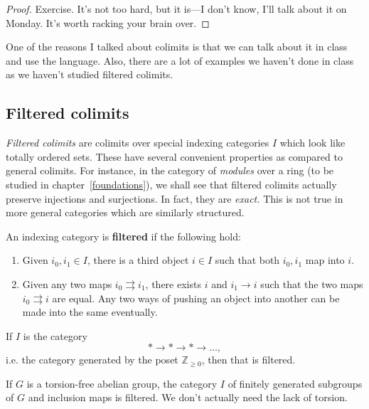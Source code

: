 \begin{proof} 
Exercise. It's not too hard, but it is---I don't know, I'll talk about it on
Monday. It's worth racking your brain over.
\end{proof} 

One of the reasons I talked about colimits is that we can talk about it in
class and use the language. Also, there are a lot of examples we haven't done
in class as we haven't studied filtered colimits.

\subsection{Filtered colimits}


\emph{Filtered colimits} are colimits
over special indexing categories $I$ which look like totally ordered sets.
These have several convenient properties as compared to general colimits.
For instance, in the category of \emph{modules} over a ring (to be studied in
chapter~\ref{foundations}), we shall see that filtered colimits actually
preserve injections and surjections. In fact, they are \emph{exact.} This is
not true in more general categories which are similarly structured.



\begin{definition} 
An indexing category is \textbf{filtered} if the following hold:
\begin{enumerate}
\item Given $i_0, i_1 \in I$, there is a third object $i \in I$ such that both
$i_0, i_1$ map into $i$. 
\item Given any two maps $i_0 \rightrightarrows i_1$, there exists $i$ and $i_1
\to i$ such that the two maps $i_0 \rightrightarrows i$ are equal. Any two ways
of pushing an object into another can be made into the same eventually. 
\end{enumerate}
\end{definition} 

\begin{example} 
If $I$ is the category
\[ \ast \to \ast \to \ast \to \dots,  \]
i.e. the category generated by the poset $\mathbb{Z}_{\geq 0}$, then that is
filtered.
\end{example} 


\begin{example} 
If $G$ is a torsion-free abelian group, the category $I$ of finitely generated
subgroups of $G$ and inclusion maps is filtered. We don't actually need the
lack of torsion. 
\end{example} 

